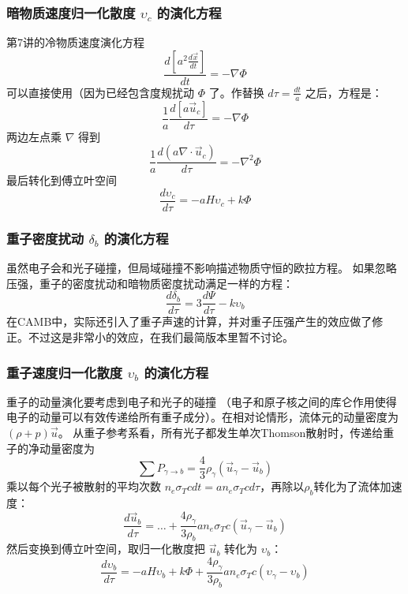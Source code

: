 \documentclass[CJK,13pt]{beamer}
\begin{document}
    \begin{frame}
      \frametitle{暗物质速度归一化散度 $\upsilon_c$ 的演化方程}
      第7讲的冷物质速度演化方程
      $$\frac{d\left[a^2\frac{d\vec{x}}{dt}\right]}{dt} = -\nabla\Phi$$
      可以直接使用（因为已经包含度规扰动 $\Phi$ 了。作替换 $d\tau = \frac{dt}{a}$ 之后，方程是：
        $$\frac{1}{a}\frac{d\left[a\vec{u}_c\right]}{d\tau} = -\nabla\Phi$$
        两边左点乘 $\nabla$ 得到
        $$\frac{1}{a}\frac{d(a\nabla\cdot \vec{u}_c)}{d\tau} = -\nabla^2\Phi $$
        最后转化到傅立叶空间
        {\blue $$ \frac{d\upsilon_c}{d\tau} = -aH\upsilon_c  + k \Phi $$}       
    \end{frame}

    \begin{frame}
      \frametitle{重子密度扰动 $\delta_b$ 的演化方程}
      虽然电子会和光子碰撞，但局域碰撞不影响描述物质守恒的欧拉方程。 如果忽略压强，重子的密度扰动和暗物质密度扰动满足一样的方程：
      {\blue      $$ \frac{d\delta_b}{d\tau} = 3\frac{d\Psi}{d\tau} - k\upsilon_b $$}
      在CAMB中，实际还引入了重子声速的计算，并对重子压强产生的效应做了修正。不过这是非常小的效应，在我们最简版本里暂不讨论。
    \end{frame}
    

    
    \begin{frame}
      \frametitle{重子速度归一化散度 $\upsilon_b$ 的演化方程}
      重子的动量演化要考虑到电子和光子的碰撞 （电子和原子核之间的库仑作用使得电子的动量可以有效传递给所有重子成分）。在相对论情形，流体元的动量密度为 $(\rho+p)\vec{u}$。 从重子参考系看，所有光子都发生单次Thomson散射时，传递给重子的净动量密度为
      $$\sum P_{\gamma\rightarrow b} = \frac{4}{3}\rho_{\gamma}\left(\vec{u}_\gamma-\vec{u}_b\right)$$     
      乘以每个光子被散射的平均次数 $n_e\sigma_Tcdt = an_e\sigma_T c d\tau$，再除以$\rho_b$转化为了流体加速度：
      $$\frac{d\vec{u}_b}{d\tau} = \ldots + \frac{4\rho_{\gamma}}{3\rho_b}an_e\sigma_Tc\left(\vec{u}_\gamma-\vec{u}_b\right) $$
      然后变换到傅立叶空间，取归一化散度把 $\vec{u}_b$ 转化为 $\upsilon_b$：
      {\blue $$ \frac{d\upsilon_b}{d\tau} = -aH\upsilon_b  + k \Phi + \frac{4\rho_{\gamma}}{3\rho_b} an_e\sigma_Tc \left(\upsilon_\gamma-\upsilon_b\right)$$}
    \end{frame}
\end{document}
